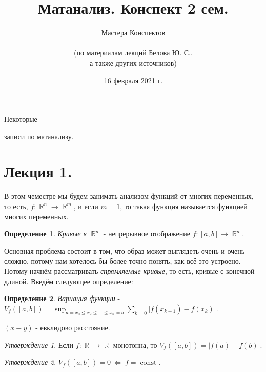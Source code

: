 \documentclass[a4paper,100pt]{article}
\title{Матанализ. Конспект 2 сем.}
\author{Мастера Конспектов\\ \\ (по материалам лекций Белова Ю. С.,\\ а также других источников)}
\date{16 февраля 2021 г.}
\theoremstyle{indented}
\theoremstyle{definition}
\newtheorem{defn}{Определение}
\theoremstyle{remark}
\newtheorem{stat}{Утверждение}
\DeclareMathOperator{\RR}{\mathbb{R}}
\DeclareMathOperator{\const}{const}
\begin{document}
\newcommand{\resetexlcounters}{%
  \setcounter{exl}{0}%
} 

\newcommand{\resetremarkcounters}{%
  \setcounter{remark}{0}%
} 

\newcommand{\reseconscounters}{%
  \setcounter{cons}{0}%
} 

\newcommand{\resetall}{%
    \resetexlcounters
    \resetremarkcounters
    \reseconscounters%
}

\maketitle 

\newpage

\hypertarget{t1}{Некоторые} записи по матанализу.
\tableofcontents

\newpage


\section{Лекция 1.}

В этом чеместре мы будем занимать анализом функций от многих переменных, то есть,  $f:\RR^n\rightarrow \RR^m$,  и если $m=1$, то такая функция называется функцией многих переменных. \ 

\begin{defn}
    \textit{Кривые в $\RR^n$} - непрерывное отображение $f:[a, b]\rightarrow \RR^n$.
\end{defn}

Основная проблема состоит в том, что образ может выглядеть очень и очень сложно, потому нам хотелось бы более точно понять, как всё это устроено. Потому начнём рассматривать \textit{спрямляемые кривые}, то есть, кривые с конечной длиной. Введём следующее определение: 

\begin{defn}
    \textit{Вариация функции} - $V_f([a, b])=\sup_{a=x_0\leq x_2\leq \ldots\leq x_n=b} \sum_{k=0}\vert f(x_{k+1})-f(x_k)\vert$. 
\end{defn}

$(x-y)$ - евклидово расстояние.

\begin{stat}
    Если $f:\RR\rightarrow \RR$ монотонна, то $V_f([a, b])=\vert f(a)-f(b)\vert $.
\end{stat}

\begin{stat}
    $V_f([a, b])=0 \: \Leftrightarrow \: f=\const$.
\end{stat}
\end{document}
